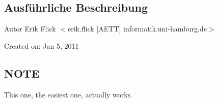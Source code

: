 \subsection{Ausführliche Beschreibung}
\begin{DoxyAuthor}{Autor}
Erik Flick $<$erik.flick \mbox{[}AETT\mbox{]} informatik.uni-\/hamburg.de$>$
\end{DoxyAuthor}
Created on: Jan 5, 2011\hypertarget{GaussianMixtureModel1D_8h_09_09_NOTE}{}\subsection{NOTE}\label{GaussianMixtureModel1D_8h_09_09_NOTE}
This one, the easiest one, actually works. 